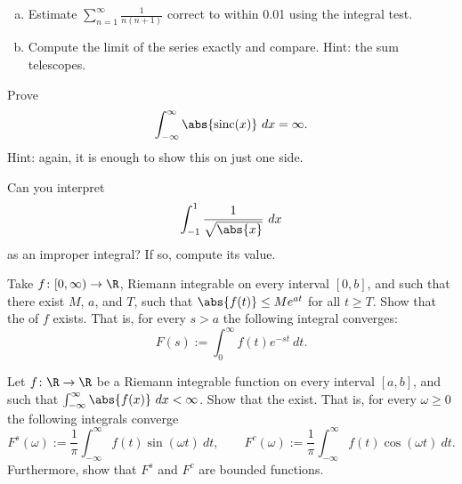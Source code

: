 \documentclass[12pt]{book}
\begin{document}
\begin{exercise}
\begin{enumerate}[a)]
 \item Estimate $\sum\limits_{n=1}^\infty \frac{1}{n(n+1)}$ correct to within 0.01
using the integral test.
  \item Compute the limit of the series exactly
and compare.
Hint: the sum telescopes.
\end{enumerate}
\end{exercise}

\begin{exercise}
Prove 
\begin{equation*}
\int_{-\infty}^\infty \abs{\operatorname{sinc}(x)}~dx = \infty .
\end{equation*}
Hint: again, it is enough to show this on just one side.
\end{exercise}

\begin{exercise}
Can you interpret
\begin{equation*}
\int_{-1}^1 \frac{1}{\sqrt{\abs{x}}}~dx
\end{equation*}
as an improper integral?
  If so, compute its value.
\end{exercise}

\begin{exercise}
Take $f \colon [0,\infty) \to \R$, Riemann integrable on
every interval $[0,b]$, and such that there exist $M$, $a$, and $T$,
such that $\abs{f(t)} \leq M e^{at}$ for all $t \geq T$.
Show that the
\emph{} of $f$ exists.
That is, for
every $s > a$ the following integral converges:
\begin{equation*}
F(s) := \int_{0}^\infty f(t) e^{-st} ~dt .
\end{equation*}
\end{exercise}

\begin{exercise}
Let $f \colon \R \to \R$ be a Riemann integrable function
on every interval $[a,b]$, and such
that $\int_{-\infty}^\infty \abs{f(x)}~dx < \infty$.
Show that the
\emph{}
exist.
That is, for every $\omega \geq 0$ the
following integrals converge
\begin{equation*}
F^s(\omega) := \frac{1}{\pi} \int_{-\infty}^\infty f(t) \sin(\omega t) ~dt ,
\qquad
F^c(\omega) := \frac{1}{\pi} \int_{-\infty}^\infty f(t) \cos(\omega t) ~dt .
\end{equation*}
Furthermore, show that $F^s$ and $F^c$ are bounded functions.
\end{exercise}
\end{document}
